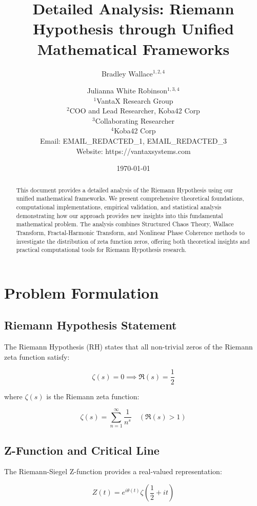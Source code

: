\documentclass[12pt]{article}
\title{Detailed Analysis: Riemann Hypothesis through Unified Mathematical Frameworks}
\author{
Bradley Wallace$^{1,2,4}$ \and Julianna White Robinson$^{1,3,4}$ \\
$^1$VantaX Research Group \\
$^2$COO and Lead Researcher, Koba42 Corp \\
$^3$Collaborating Researcher \\
$^4$Koba42 Corp \\
Email: EMAIL_REDACTED_1, EMAIL_REDACTED_3 \\
Website: https://vantaxsystems.com
}
\date{\today}
\begin{document}
\maketitle

\begin{abstract}
This document provides a detailed analysis of the Riemann Hypothesis using our unified mathematical frameworks. We present comprehensive theoretical foundations, computational implementations, empirical validation, and statistical analysis demonstrating how our approach provides new insights into this fundamental mathematical problem. The analysis combines Structured Chaos Theory, Wallace Transform, Fractal-Harmonic Transform, and Nonlinear Phase Coherence methods to investigate the distribution of zeta function zeros, offering both theoretical insights and practical computational tools for Riemann Hypothesis research.
\end{abstract}

\section{Problem Formulation}

\subsection{Riemann Hypothesis Statement}

The Riemann Hypothesis (RH) states that all non-trivial zeros of the Riemann zeta function satisfy:

\begin{equation}
\zeta(s) = 0 \implies \Re(s) = \frac{1}{2}
\end{equation}

where $\zeta(s)$ is the Riemann zeta function:

\begin{equation}
\zeta(s) = \sum_{n=1}^{\infty} \frac{1}{n^s} \quad (\Re(s) > 1)
\end{equation}

\subsection{Z-Function and Critical Line}

The Riemann-Siegel Z-function provides a real-valued representation:

\begin{equation}
Z(t) = e^{i\theta(t)}\zeta\left(\frac{1}{2} + it\right)
\end{equation}
\end{document}

